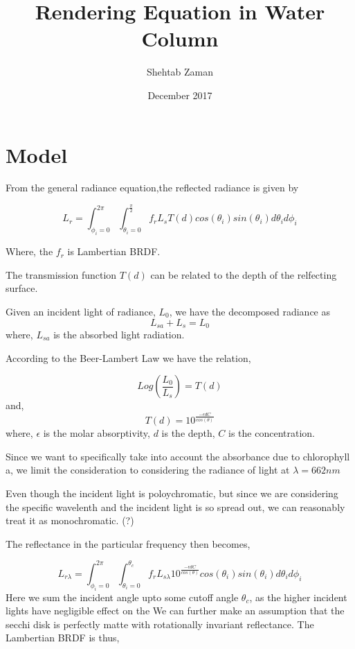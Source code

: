 \documentclass{article}
\title{Rendering Equation in Water Column}
\author{Shehtab Zaman }
\date{December 2017}
\begin{document}
\section{Model}

From the general radiance equation,the reflected radiance is given by

\begin{equation}
  L_r = \int^{2\pi}_{\phi_i = 0}\int^{\frac{\pi}{2}}_{\theta_i = 0}
  f_r L_s T(d)cos(\theta_i)sin(\theta_i)d\theta_i d\phi_i
\end{equation}

Where, the $ f_r$ is Lambertian BRDF.

The transmission function $T(d)$ can be related to the depth of the relfecting
surface.

Given an incident light of radiance, $L_0$,
we have the decomposed radiance as
$$L_{sa} + L_{s} = L_0$$
where, $ L_{sa}$ is the absorbed light radiation.



According to the Beer-Lambert Law we have the relation,

\begin{equation}
  Log\left(\frac{L_0}{L_{s}}\right) = T(d)
\end{equation}
and,
\begin{equation}
  T(d) = 10^\frac{-\epsilon d C}{cos(\theta)}
\end{equation}
where, $\epsilon$ is the molar absorptivity, $ d$ is the depth, $ C$ is the concentration.

Since we want to specifically take into account the
absorbance due to chlorophyll a, we limit the consideration
to considering the radiance of light at $\lambda = 662nm$

Even though the incident light is poloychromatic, but since we are considering the specific wavelenth
and the incident light is so spread out, we can reasonably treat it as monochromatic. (?)

The reflectance in the particular frequency then becomes,

\begin{equation}
  L_{r \lambda} = \int^{2\pi}_{\phi_i = 0}\int^{\theta_c}_{\theta_i = 0}
  f_r L_{s\lambda} 10^\frac{-\epsilon d C}{cos(\theta)}cos(\theta_i)sin(\theta_i)d\theta_i d\phi_i
\end{equation}
Here we sum the incident angle upto some cutoff angle $\theta_c$, as the higher incident lights
have negligible effect on the
We can further make an assumption that the secchi disk is perfectly matte with rotationally
invariant reflectance. The Lambertian BRDF is thus,
\end{document}
